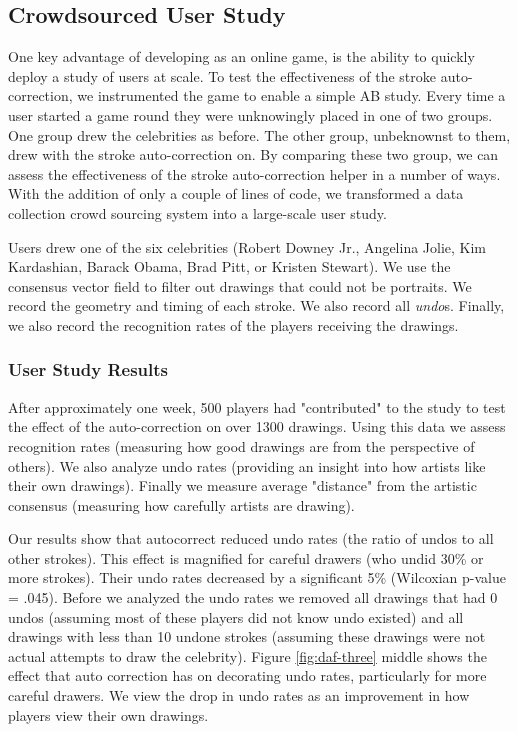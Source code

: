 \subsection {Crowdsourced User Study}

One key advantage of developing \daf as an online game, is the ability to quickly deploy a study of users at scale. To test the effectiveness of the stroke auto-correction, we instrumented the game to enable a simple AB study. Every time a user started a game round they were unknowingly placed in one of two groups. One group drew the celebrities as before. The other group, unbeknownst to them, drew with the stroke auto-correction on. By comparing these two group, we can assess the effectiveness of the stroke auto-correction helper in a number of ways. With the addition of only a couple of lines of code, we transformed a data collection crowd sourcing system into a large-scale user study.

Users drew one of the six celebrities (Robert Downey Jr., Angelina Jolie, Kim Kardashian, Barack Obama, Brad Pitt, or Kristen Stewart). We use the consensus vector field to filter out drawings that could not be portraits. We record the geometry and timing of each stroke. We also record all {\em undo}s. Finally, we also record the recognition rates of the players receiving the drawings.

\subsubsection {User Study Results}

After approximately one week, 500 players had "contributed" to the study to test the effect of the auto-correction on over 1300 drawings. Using this data we assess recognition rates (measuring how good drawings are from the perspective of others). We also analyze undo rates (providing an insight into how artists like their own drawings). Finally we measure average "distance" from the artistic consensus (measuring how carefully artists are drawing).

Our results show that autocorrect reduced undo rates (the ratio of undos to all other strokes). This effect is magnified for careful drawers (who undid 30\% or more strokes). Their undo rates decreased by a significant 5\% (Wilcoxian p-value = .045).  Before we analyzed the undo rates we removed all drawings that had 0 undos (assuming most of these players did not know undo existed) and all drawings with less than 10 undone strokes (assuming these drawings were not actual attempts to draw the celebrity).  Figure \ref{fig:daf-three} middle shows the effect that auto correction has on decorating undo rates, particularly for more careful drawers. We view the drop in undo rates as an improvement in how players view their own drawings.

